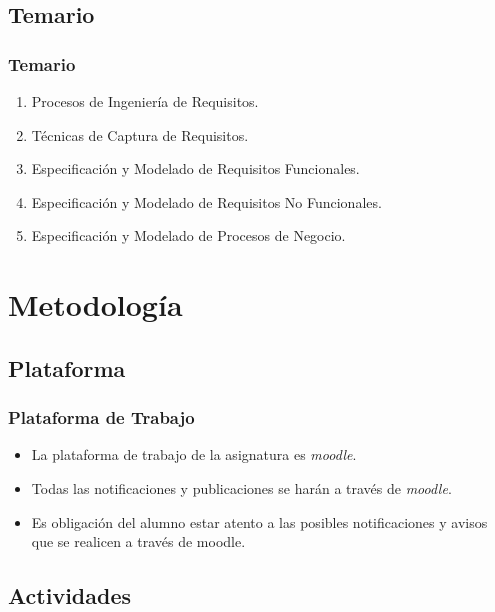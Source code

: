\documentclass[a4paper,slidestop,xcolor=pst,dvips,blue]{beamer}
\begin{document}
\subsection{Temario}

\begin{frame}[c]
	\frametitle{Temario}
	\begin{enumerate}[<+->]
		\item Procesos de Ingeniería de Requisitos.
		\item Técnicas de Captura de Requisitos.
		\item Especificación y Modelado de Requisitos Funcionales.
		\item Especificación y Modelado de Requisitos No Funcionales.
		\item Especificación y Modelado de Procesos de Negocio.
	\end{enumerate}
\end{frame}

\section{Metodología}

\subsection{Plataforma}

\begin{frame}[c]
	\frametitle{Plataforma de Trabajo}
	\begin{itemize}
		\item<1-> La plataforma de trabajo de la asignatura es \emph{moodle}.
		\item<2-> Todas las notificaciones y publicaciones se harán a través de \emph{moodle}.
		\item<3-> \alert{Es obligación del alumno estar atento a las posibles notificaciones y avisos que se realicen a través de moodle}.
	\end{itemize}
\end{frame}

\subsection{Actividades}
\end{document}
